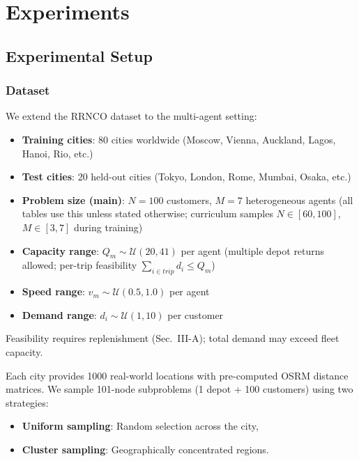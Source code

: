 \documentclass[journal,twoside,web]{ieeecolor}
\theoremstyle{definition}
\theoremstyle{remark}
\theoremstyle{definition}
\begin{document}
\section{Experiments}

\subsection{Experimental Setup}

\subsubsection{Dataset}
We extend the RRNCO dataset to the multi-agent setting:
\begin{itemize}
    \item \textbf{Training cities}: 80 cities worldwide (Moscow, Vienna, Auckland, Lagos, Hanoi, Rio, etc.)
    \item \textbf{Test cities}: 20 held-out cities (Tokyo, London, Rome, Mumbai, Osaka, etc.)
    \item \textbf{Problem size (main)}: $N=100$ customers, $M=7$ heterogeneous agents (all tables use this unless stated otherwise; curriculum samples $N\in[60,100]$, $M\in[3,7]$ during training)
    \item \textbf{Capacity range}: $Q_m \sim \mathcal{U}(20, 41)$ per agent (multiple depot returns allowed; per-trip feasibility $\sum_{i\in trip} d_i\le Q_m$)
    \item \textbf{Speed range}: $v_m \sim \mathcal{U}(0.5, 1.0)$ per agent
    \item \textbf{Demand range}: $d_i \sim \mathcal{U}(1, 10)$ per customer
\end{itemize}
Feasibility requires replenishment (Sec.~III-A); total demand may exceed fleet capacity.

Each city provides 1000 real-world locations with pre-computed OSRM distance matrices. We sample 101-node subproblems (1 depot + 100 customers) using two strategies:
\begin{itemize}
    \item \textbf{Uniform sampling}: Random selection across the city,
    \item \textbf{Cluster sampling}: Geographically concentrated regions.
\end{itemize}
\end{document}
